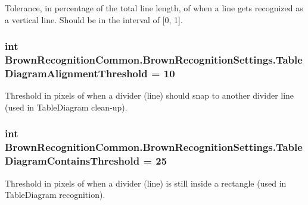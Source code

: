\-Tolerance, in percentage of the total line length, of when a line gets recognized as a vertical line. \-Should be in the interval of \mbox{[}0, 1\mbox{]}. 

\hypertarget{class_brown_recognition_common_1_1_brown_recognition_settings_afe4e9f0ca9dbb24dec2af592f5cddbc6}{
\subsubsection[{\-Table\-Diagram\-Alignment\-Threshold}]{\setlength{\rightskip}{0pt plus 5cm}int {\bf \-Brown\-Recognition\-Common.\-Brown\-Recognition\-Settings.\-Table\-Diagram\-Alignment\-Threshold} = 10}}
\label{class_brown_recognition_common_1_1_brown_recognition_settings_afe4e9f0ca9dbb24dec2af592f5cddbc6}


\-Threshold in pixels of when a divider (line) should snap to another divider line (used in \-Table\-Diagram clean-\/up). 

\hypertarget{class_brown_recognition_common_1_1_brown_recognition_settings_a57bb48bd1047135f656b981478c8c24a}{
\subsubsection[{\-Table\-Diagram\-Contains\-Threshold}]{\setlength{\rightskip}{0pt plus 5cm}int {\bf \-Brown\-Recognition\-Common.\-Brown\-Recognition\-Settings.\-Table\-Diagram\-Contains\-Threshold} = 25}}
\label{class_brown_recognition_common_1_1_brown_recognition_settings_a57bb48bd1047135f656b981478c8c24a}


\-Threshold in pixels of when a divider (line) is still inside a rectangle (used in \-Table\-Diagram recognition). 

